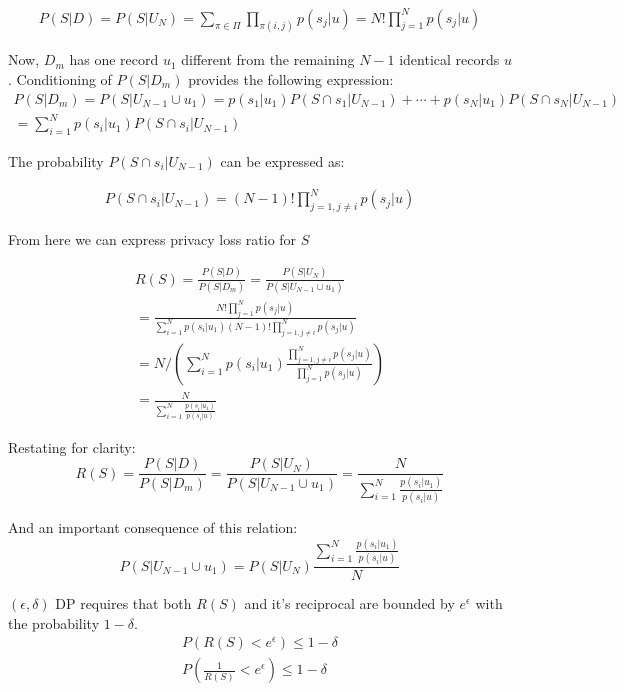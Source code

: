 \documentclass[11pt]{article}
\begin{document}
\begin{align}
P(S|D) = P(S|U_N) = \sum_{\pi \in \Pi}  \prod_{\pi(i,j)}   p(s_j | u) = N!   \prod_{j=1}^N p(s_j | u) 
\end{align}

Now, $D_m$ has one record $u_1$ different from the remaining $N-1$ identical records $u$.  Conditioning of $P(S|D_m)$ provides the following expression:
\begin{align}
P(S|D_m) =  P(S|U_{N-1} \cup u_1) = p(s_1|u_1) P(S \cap s_1 | U_{N-1}) + \cdots  + p(s_N|u_1) P(S \cap s_N | U_{N-1}) \\
= \sum_{i=1}^N p(s_i | u_1) P(S \cap s_i | U_{N-1})
\end{align}

The probability $ P(S \cap s_i | U_{N-1})$ can be expressed as:

\begin{align}
P(S \cap s_i | U_{N-1})=   (N-1)! \prod_{j=1, j \ne i}^N p(s_j | u) 
\end{align}

From here we can express privacy loss ratio for $S$     

\begin{align}
R(S) =  \frac{P(S|D)}{ P(S|D_m)}  = \frac{ P(S|U_N)} {P(S|U_{N-1} \cup u_1)} \\
= \frac  {  N!   \prod_{j=1}^N p(s_j | u)  }{ \sum_{i=1}^N p(s_i | u_1)   (N-1)! \prod_{j=1, j \ne i}^N p(s_j | u)  } \\
=  N / \left ( \sum_{i=1}^N p(s_i | u_1) \frac {  \prod_{j=1, j \ne i}^N p(s_j | u)  } {  \prod_{j=1}^N p(s_j | u)  } \right )\\
=    \frac{N}{\sum_{i=1}^N  \frac{ p(s_i | u_1) } { p(s_i | u) }}
\end{align}

Restating for clarity:
\begin{equation} \label{eq:outlierPLR} 
R(S) =  \frac{P(S|D)}{ P(S|D_m)}  = \frac{ P(S|U_N)} {P(S|U_{N-1} \cup u_1)} = \frac{N}{\sum_{i=1}^N  \frac{ p(s_i | u_1) } { p(s_i | u) }}
\end{equation}

And an important consequence of this relation:
\begin{equation} \label{eq:outlierProbs} 
P(S|U_{N-1} \cup u_1) =  P(S|U_N)  \frac{\sum_{i=1}^N  \frac{ p(s_i | u_1) } { p(s_i | u) }}{N}
\end{equation}

$(\epsilon, \delta)$ DP requires that both $R(S)$ and it's reciprocal are bounded by $e^{\epsilon}$ with the probability $1-\delta$.
\begin{align}
P(R(S) < e^{\epsilon} ) \le 1 - \delta \\ 
P(\frac{1}{R(S)} <  e^{\epsilon} ) \le 1 - \delta
\end{align}
\end{document}
